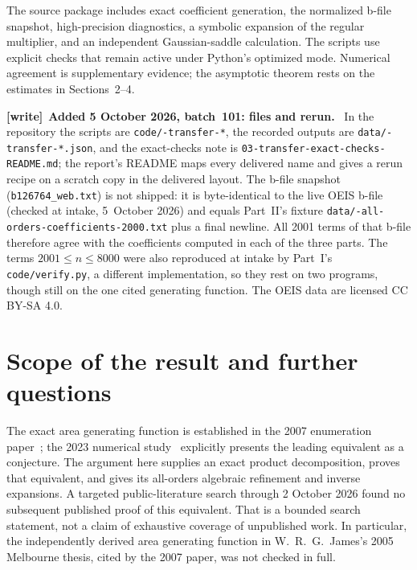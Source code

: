 \documentclass[11pt]{article}
\numberwithin{equation}{section}
\theoremstyle{definition}\newtheorem{definition}[theorem]{Definition}
\theoremstyle{remark}\newtheorem{remark}[theorem]{Remark}
\newenvironment{writenote}[1][]{\par\smallskip\begingroup\small
 \noindent\textbf{[write]}\if\relax\detokenize{#1}\relax\else~\textbf{#1.}\fi\ }%
 {\par\endgroup\smallskip}
\begin{document}
The source package includes exact coefficient generation, the normalized b-file snapshot, high-precision diagnostics, a symbolic expansion of the regular multiplier, and an independent Gaussian-saddle calculation. The scripts use explicit checks that remain active under Python's optimized mode. Numerical agreement is supplementary evidence; the asymptotic theorem rests on the estimates in Sections~2--4.

\begin{writenote}[Added 5 October 2026, batch~101: files and rerun]
In the repository the scripts are
\texttt{code/-transfer-*}, the recorded outputs are
\texttt{data/-transfer-*.json}, and the exact-checks note is
\texttt{03-transfer-exact-checks-README.md}; the report's README maps every
delivered name and gives a rerun recipe on a scratch copy in the delivered
layout. The b-file snapshot (\texttt{b126764\_web.txt}) is not shipped: it is
byte-identical to the live OEIS b-file (checked at intake, 5~October 2026)
and equals Part~II's fixture \texttt{data/-all-orders-coefficients-2000.txt}
plus a final newline. All 2001 terms of that b-file therefore agree with the
coefficients computed in each of the three parts. The terms $2001\le n\le8000$
were also reproduced at intake by Part~I's \texttt{code/verify.py}, a
different implementation, so they rest on two programs, though still on
the one cited generating function. The OEIS data are licensed CC BY-SA 4.0.
\end{writenote}


\section{Scope of the result and further questions}\label{lcp:tr:sec:context}
The exact area generating function is established in the 2007 enumeration paper~\cite{castiglione}; the 2023 numerical study~\cite{gk} explicitly presents the leading equivalent as a conjecture. The argument here supplies an exact product decomposition, proves that equivalent, and gives its all-orders algebraic refinement and inverse expansions. A targeted public-literature search through 2 October 2026 found no subsequent published proof of this equivalent. That is a bounded search statement, not a claim of exhaustive coverage of unpublished work. In particular, the independently derived area generating function in W.~R.~G.~James's 2005 Melbourne thesis, cited by the 2007 paper, was not checked in full.
\end{document}

